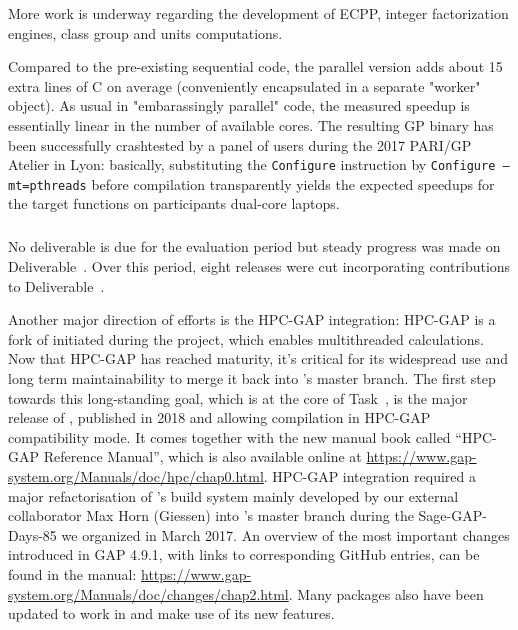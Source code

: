 More work is underway regarding the development of  ECPP, integer
factorization engines, class group and units computations.

Compared to the pre-existing sequential code, the parallel version adds about 15 extra lines of
C on average (conveniently encapsulated in a separate "worker" object). As usual
in "embarassingly parallel" code, the measured speedup is essentially linear in
the number of available cores. The resulting GP binary has been successfully
crashtested by a panel of users during the 2017 PARI/GP Atelier in Lyon:
basically, substituting the \texttt{Configure} instruction by \texttt{Configure --mt=pthreads}
before compilation transparently yields the expected speedups for the target
functions on participants dual-core laptops. 


\subparagraph{}

No deliverable is due for the evaluation period but steady progress was made on
Deliverable~. Over this period, eight releases were cut
incorporating contributions to Deliverable~.

Another major direction of efforts is the HPC-GAP integration:
HPC-GAP is a fork of \GAP initiated during the \scienceproject project, which
enables multithreaded calculations. Now that HPC-GAP has reached
maturity, it's critical for its widespread use and long term
maintainability to merge it back into \GAP's master branch.
The first step towards this long-standing goal, which is at the core of
Task~, is the major release of , published in 2018 and allowing compilation in HPC-GAP
compatibility mode. It comes together with the new manual book called ``HPC-GAP Reference Manual'',
which is also available online at \url{https://www.gap-system.org/Manuals/doc/hpc/chap0.html}.
HPC-GAP integration required a major
refactorisation of \GAP's build system
mainly developed by our external collaborator Max Horn (Giessen) into \GAP's master
branch during the Sage-GAP-Days-85 we organized in March 2017. 
An overview of the most important changes introduced in GAP 4.9.1,
with links to corresponding GitHub entries,
can be found in the \GAP manual: \url{https://www.gap-system.org/Manuals/doc/changes/chap2.html}.
Many \GAP packages also have been updated to work in  and make use of its new features.

\subparagraph{}

